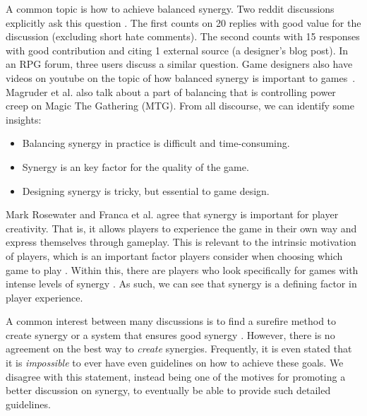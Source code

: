 A common topic is how to achieve balanced synergy. Two reddit discussions explicitly ask this question \cite{garydallison_synergies_2023,notgayyy_how_2022}. The first counts on 20 replies with good value for the discussion (excluding short hate comments). The second counts with 15 responses with good contribution and citing 1 external source (a designer's blog post). In an RPG forum, three users discuss a similar question\cite{whymme_how_nodate}. Game designers also have videos on youtube on the topic of how balanced synergy is important to games~\cite{ruswick_importance_nodate,game_maker_toolkit_how_2024}. Magruder et al. \cite{magruder_conservative_2022} also talk about a part of balancing that is controlling power creep on Magic The Gathering (MTG). From all discourse, we can identify some insights:
\begin{itemize}
    \item Balancing synergy in practice is difficult and time-consuming.
    \item Synergy is an key factor for the quality of the game.
    \item Designing synergy is tricky, but essential to game design.
\end{itemize}

Mark Rosewater \cite{rosewater_living_2013} and Franca et al. \cite{franca_creativestone_2024} agree that synergy is important for player creativity. That is, it allows players to experience the game in their own way and express themselves through gameplay. This is relevant to the intrinsic motivation of players, which is an important factor players consider when choosing which game to play \cite{tyack_self-determination_2020}.
Within this, there are players who look specifically for games with intense levels of synergy \cite{noauthor_good_2021,noauthor_lack_nodate,viktrol13_games_2022}. As such, we can see that synergy is a defining factor in player experience.

A common interest between many discussions is to find a surefire method to create synergy or a system that ensures good synergy \cite{salen_rules_2004,whymme_how_nodate,notgayyy_how_2022,agoodusern4me_what_2022}. However, there is no agreement on the best way to \textit{create} synergies. Frequently, it is even stated that it is \textit{impossible} to ever have even guidelines on how to achieve these goals. We disagree with this statement, instead being one of the motives for promoting a better discussion on synergy, to eventually be able to provide such detailed guidelines.
